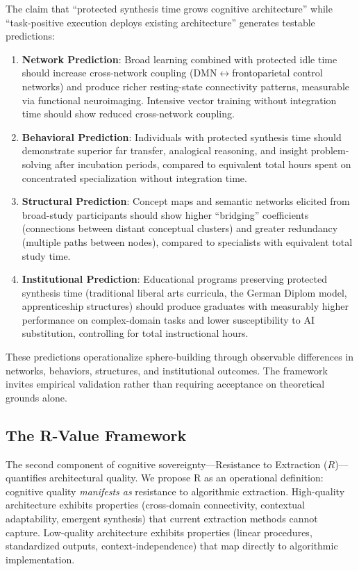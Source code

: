 The claim that ``protected synthesis time grows cognitive architecture'' while ``task-positive execution deploys existing architecture'' generates testable predictions:

\begin{enumerate}
    \item \textbf{Network Prediction}: Broad learning combined with protected idle time should increase cross-network coupling (DMN$\leftrightarrow$frontoparietal control networks) and produce richer resting-state connectivity patterns, measurable via functional neuroimaging. Intensive vector training without integration time should show reduced cross-network coupling.
    
    \item \textbf{Behavioral Prediction}: Individuals with protected synthesis time should demonstrate superior far transfer, analogical reasoning, and insight problem-solving after incubation periods, compared to equivalent total hours spent on concentrated specialization without integration time.
    
    \item \textbf{Structural Prediction}: Concept maps and semantic networks elicited from broad-study participants should show higher ``bridging'' coefficients (connections between distant conceptual clusters) and greater redundancy (multiple paths between nodes), compared to specialists with equivalent total study time.
    
    \item \textbf{Institutional Prediction}: Educational programs preserving protected synthesis time (traditional liberal arts curricula, the German Diplom model, apprenticeship structures) should produce graduates with measurably higher performance on complex-domain tasks and lower susceptibility to AI substitution, controlling for total instructional hours.
\end{enumerate}

These predictions operationalize sphere-building through observable differences in networks, behaviors, structures, and institutional outcomes. The framework invites empirical validation rather than requiring acceptance on theoretical grounds alone.

\subsection{The R-Value Framework}

The second component of cognitive sovereignty—Resistance to Extraction ($R$)—quantifies architectural quality. We propose R as an operational definition: cognitive quality \textit{manifests as} resistance to algorithmic extraction. High-quality architecture exhibits properties (cross-domain connectivity, contextual adaptability, emergent synthesis) that current extraction methods cannot capture. Low-quality architecture exhibits properties (linear procedures, standardized outputs, context-independence) that map directly to algorithmic implementation.

